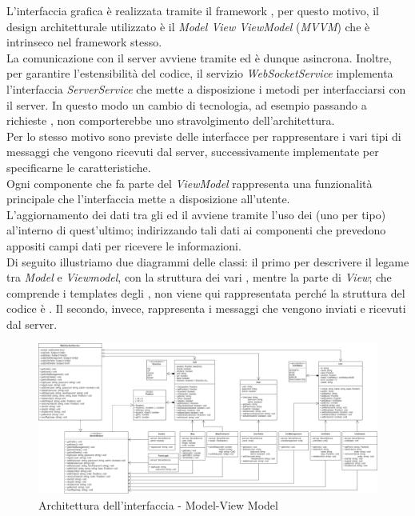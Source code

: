 L'interfaccia grafica è realizzata tramite il framework , per questo motivo, il design architetturale utilizzato è il \textit{Model View ViewModel} (\textit{MVVM}) che è intrinseco nel framework stesso. \\
La comunicazione con il server avviene tramite  ed è dunque asincrona. 
Inoltre, per garantire l'estensibilità del codice, il servizio \textit{WebSocketService} implementa l'interfaccia \textit{ServerService} che mette a disposizione i metodi per interfacciarsi con il server. In questo modo un cambio di tecnologia, ad esempio passando a richieste , non comporterebbe uno stravolgimento dell'architettura. \\
Per lo stesso motivo sono previste delle interfacce per rappresentare i vari tipi di messaggi che vengono ricevuti dal server, successivamente implementate per specificarne le caratteristiche. \\
Ogni componente che fa parte del \textit{ViewModel} rappresenta una funzionalità principale che l'interfaccia mette a disposizione all'utente.\\
 L'aggiornamento dei dati tra gli  ed il  avviene tramite l'uso dei  (uno per tipo) al'interno di quest'ultimo; indirizzando tali dati  ai componenti che prevedono appositi campi dati per ricevere le informazioni.\\
\newline
Di seguito illustriamo due diagrammi delle classi: il primo per descrivere il legame tra \textit{Model} e \textit{Viewmodel}, con la struttura dei vari , mentre la parte di \textit{View}; che comprende i templates degli , non viene qui rappresentata perché la struttura del codice è .
Il secondo, invece, rappresenta i messaggi che vengono inviati e ricevuti dal server.
\newpage

\begin{landscape}
	\begin{figure}[h!]
		\includegraphics[width=24cm]{img/ui_component.png}
		\caption{Architettura dell'interfaccia - Model-View Model}
	\end{figure}
\end{landscape}
\newpage

